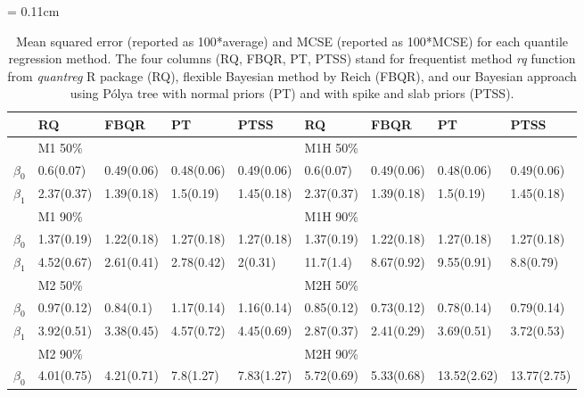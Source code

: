 \documentclass[12pt]{article}
\newcommand{\polya}{P\'{o}lya}
\begin{document}
\begin{center}
  \begin{table}[h]
    \centering
    \caption[]{ Mean squared error (reported as 100*average) and MCSE
      (reported as 100*MCSE) for each
      quantile regression method.   The four
      columns (RQ, FBQR,
      PT, PTSS) stand for frequentist method \textit{rq} function from
      \textit{quantreg} R package (RQ), flexible Bayesian method by Reich (FBQR), and
      our Bayesian approach using \polya{} tree with normal priors (PT) and with
      spike and slab priors (PTSS).}
    \vspace{4mm}
    \tabcolsep = 0.11cm
    \begin{tabular}[tb]{cllllllll}
  \hline
          & RQ          & FBQR        & PT          & PTSS        & RQ          & FBQR        & PT          & PTSS        \\
      \hline
          & M1 50\%     &             &             &             & M1H 50\%    &             &             &             \\
$\beta_0$ & 0.6(0.07)   & 0.49(0.06)  & 0.48(0.06)  & 0.49(0.06)  & 0.6(0.07)   & 0.49(0.06)  & 0.48(0.06)  & 0.49(0.06)  \\
$\beta_1$ & 2.37(0.37)  & 1.39(0.18)  & 1.5(0.19)   & 1.45(0.18)  & 2.37(0.37)  & 1.39(0.18)  & 1.5(0.19)   & 1.45(0.18)  \\
          & M1 90\%     &             &             &             & M1H 90\%    &             &             &             \\
$\beta_0$ & 1.37(0.19)  & 1.22(0.18)  & 1.27(0.18)  & 1.27(0.18)  & 1.37(0.19)  & 1.22(0.18)  & 1.27(0.18)  & 1.27(0.18)  \\
$\beta_1$ & 4.52(0.67)  & 2.61(0.41)  & 2.78(0.42)  & 2(0.31)     & 11.7(1.4)   & 8.67(0.92)  & 9.55(0.91)  & 8.8(0.79)   \\
\hline        \hline
          & M2 50\%     &             &             &             & M2H 50\%    &             &             &             \\
$\beta_0$ & 0.97(0.12)  & 0.84(0.1)   & 1.17(0.14)  & 1.16(0.14)  & 0.85(0.12)  & 0.73(0.12)  & 0.78(0.14)  & 0.79(0.14)  \\
$\beta_1$ & 3.92(0.51)  & 3.38(0.45)  & 4.57(0.72)  & 4.45(0.69)  & 2.87(0.37)  & 2.41(0.29)  & 3.69(0.51)  & 3.72(0.53)  \\
          & M2 90\%     &             &             &             & M2H 90\%    &             &             &             \\
$\beta_0$ & 4.01(0.75)  & 4.21(0.71)  & 7.8(1.27)   & 7.83(1.27)  & 5.72(0.69)  & 5.33(0.68)  & 13.52(2.62) & 13.77(2.75) \\

\end{tabular}
\end{table}
\end{center}
\end{document}
